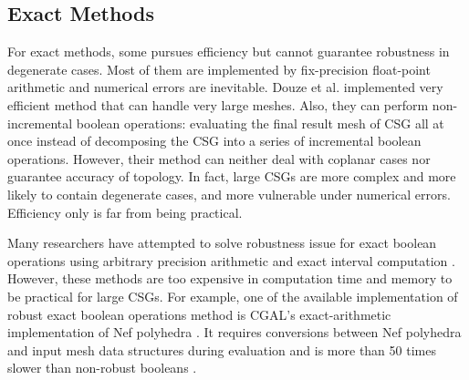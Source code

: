\documentclass[10pt,journal,compsoc]{IEEEtran}
\begin{document}
\subsection{Exact Methods}

For exact methods, some \cite{ogayar2015deferred,douze2015quickcsg,zhou2016mesh,xu2013fast,feito2013fast} pursues efficiency but cannot guarantee robustness in degenerate cases. Most of them are implemented by fix-precision float-point arithmetic and numerical errors are inevitable. Douze et al. \cite{douze2015quickcsg} implemented very efficient method that can handle very large meshes. Also, they can perform non-incremental boolean operations: evaluating the final result mesh of CSG all at once instead of decomposing the CSG into a series of incremental boolean operations. However, their method can neither deal with coplanar cases nor guarantee accuracy of topology. In fact, large CSGs are more complex and more likely to contain degenerate cases, and more vulnerable under numerical errors. Efficiency only is far from being practical.


Many researchers have attempted to solve robustness issue for exact boolean operations using arbitrary precision arithmetic \cite{banerjee1996topologically, fortune1995polyhedral, keyser2004esolid, granados2003boolean, hachenberger2005boolean} and exact interval computation \cite{fang1993robustness, hu1996robust, segal1990using}. However, these methods are too expensive in computation time and memory to be practical for large CSGs. For example, one of the available implementation of robust exact boolean operations method is CGAL's \cite{cgal:hk-bonp3-15a} exact-arithmetic implementation \cite{granados2003boolean} of Nef polyhedra \cite{bieri1988elementary}. It requires conversions between Nef polyhedra and input mesh data structures during evaluation and is more than 50 times slower than non-robust booleans \cite{bernstein2009fast}.
\end{document}
